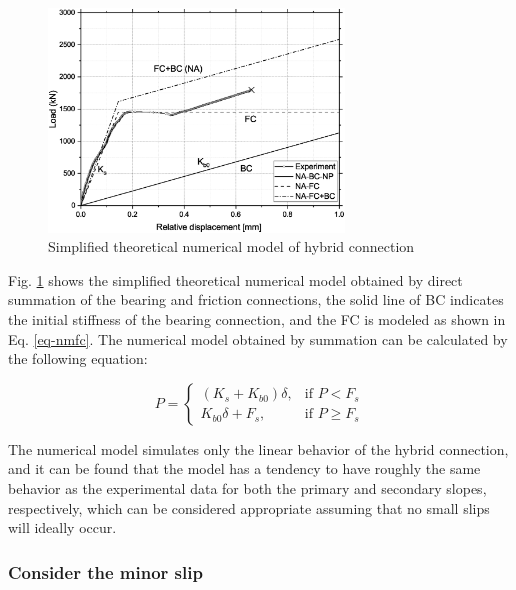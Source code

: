 \begin{figure}[htbp]
    \centering
    \includegraphics[width=0.7\textwidth]{imgs/ch7/NAFCBC.eps}
    \caption{Simplified theoretical numerical model of hybrid connection}
    \label{fig-nafcbc}
\end{figure}

Fig. \ref{fig-nafcbc} shows the simplified theoretical numerical model obtained by direct summation of the bearing and friction connections, the solid line of BC indicates the initial stiffness of the bearing connection, and the FC is modeled as shown in Eq. \ref{eq-nmfc}. The numerical model obtained by summation can be calculated by the following equation:

\begin{equation}\label{eq-nmhc1}
    P = \begin{cases}
        (K_s + K_{b0}) \delta, & \text{if } P < F_{s} \\
        K_{b0} \delta + F_{s}, & \text{if } P \geq F_{s}
    \end{cases}
\end{equation}

The numerical model simulates only the linear behavior of the hybrid connection, and it can be found that the model has a tendency to have roughly the same behavior as the experimental data for both the primary and secondary slopes, respectively, which can be considered appropriate assuming that no small slips will ideally occur.

\subsubsection{Consider the minor slip}

